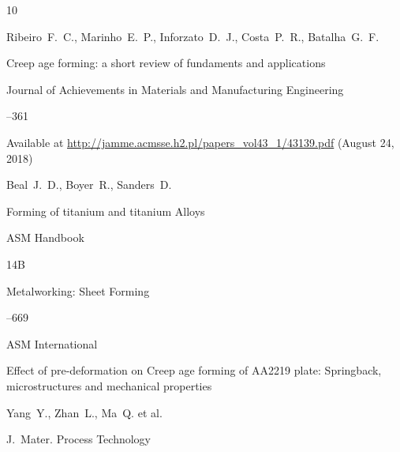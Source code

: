 







\begin{thebibliography}{10}




\by Ribeiro~F.~C., Marinho~E.~P., Inforzato~D.~J., Costa~P.~R., Batalha~G.~F. 

\paper Creep age forming: a short review of fundaments and applications 

\jour Journal of Achievements in Materials and Manufacturing Engineering




--361

\elink Available at \url{http://jamme.acmsse.h2.pl/papers_vol43_1/43139.pdf} (August 24, 2018)






\by Beal~J.~D., Boyer~R., Sanders~D.

\paper Forming of titanium and titanium Alloys  

\inbook ASM Handbook 

\bookvol 14B

\volinfo Metalworking: Sheet Forming


--669

\publaddr  ASM International








\paper Effect of pre-deformation on Creep age forming of AA2219 plate: Springback, microstructures and mechanical properties

\by Yang~Y., Zhan~L., Ma~Q. et al.

\jour J.~Mater. Process Technology



\end{thebibliography}
